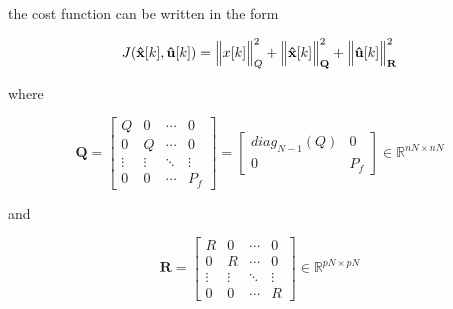 \noindent
the cost function can be written in the form

\noindent
\begin{equation}
    J(\mathbf{\hat{x}}[k], \mathbf{\hat{u}}[k]) = \Big\Vert x[k] \Big\Vert^2_{Q} + 
    \Big\Vert \mathbf{\hat{x}}[k] \Big\Vert^2_{\mathbf{Q}} + \Big\Vert \mathbf{\hat{u}}[k] \Big\Vert^2_{\mathbf{R}}
\end{equation}

\noindent
where

\begin{equation}
    \mathbf{Q} = 
    \left[
        \begin{matrix}
            Q & 0 & \cdots & 0 \\
            0 & Q & \cdots & 0 \\
            \vdots & \vdots & \ddots & \vdots \\
            0 & 0 & \cdots & P_f
        \end{matrix}
    \right]
    = 
    \left[
        \begin{matrix}
            diag_{N-1}(Q) & 0 \\
            0 & P_f
        \end{matrix}
    \right]
    \in \mathbb{R}^{nN \times nN}
\end{equation}

\noindent
and

\begin{equation}
    \mathbf{R} = 
    \left[
        \begin{matrix}
        R & 0 & \dotsm & 0 \\
        0 & R & \dotsm & 0 \\
        \vdots & \vdots & \ddots & \vdots \\
        0 & 0 & \dotsm & R
        \end{matrix}
    \right] \in \mathbb{R}^{pN \times pN}
\end{equation}
